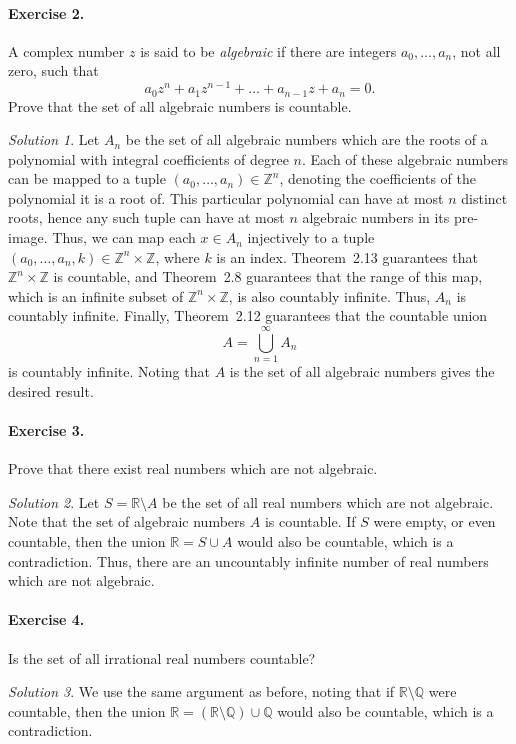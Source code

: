 \documentclass[11pt]{report}
\def\R{\mathbb{R}}
\def\Q{\mathbb{Q}}
\def\Z{\mathbb{Z}}
\theoremstyle{remark}
\newtheorem*{solution}{Solution}
\begin{document}
    \paragraph{Exercise 2.} A complex number $z$ is said to be
    \textit{algebraic} if there are integers $a_0, \dots, a_n$, not all zero,
    such that \[
        a_0z^n + a_1z^{n - 1} + \dots + a_{n - 1}z + a_n = 0.
    \] Prove that the set of all algebraic numbers is countable.
    \begin{solution}
        Let $A_n$ be the set of all algebraic numbers which are the roots of a
        polynomial with integral coefficients of degree $n$. Each of these
        algebraic numbers can be mapped to a tuple $(a_0, \dots, a_n) \in
        \Z^n$, denoting the coefficients of the polynomial it is a root of. This
        particular polynomial can have at most $n$ distinct roots, hence any such
        tuple can have at most $n$ algebraic numbers in its pre-image. Thus, we can
        map each $x \in A_n$ injectively to a tuple $(a_0, \dots, a_n, k) \in \Z^n
        \times \Z$, where $k$ is an index. Theorem~2.13 guarantees that
        $\Z^n\times\Z$ is countable, and Theorem~2.8 guarantees that the range of
        this map, which is an infinite subset of $\Z^n\times\Z$, is also countably
        infinite. Thus, $A_n$ is countably infinite.  Finally, Theorem~2.12
        guarantees that the countable union \[
            A = \bigcup_{n = 1}^\infty A_n
        \] is countably infinite. Noting that $A$ is the set of all algebraic
        numbers gives the desired result.
    \end{solution}

    \paragraph{Exercise 3.} Prove that there exist real numbers which are not
    algebraic.
    \begin{solution}
        Let $S = \R\setminus A$ be the set of all real numbers which are not
        algebraic. Note that the set of algebraic numbers $A$ is countable. If $S$ were 
        empty, or even countable, then the union $\R = S \cup A$ would also be
        countable, which is a contradiction. Thus, there are an uncountably infinite
        number of real numbers which are not algebraic.
    \end{solution}
    
    \paragraph{Exercise 4.} Is the set of all irrational real numbers countable?
    \begin{solution}
        We use the same argument as before, noting that if $\R\setminus\Q$ were
        countable, then the union $\R = (\R\setminus\Q) \cup \Q$ would also be
        countable, which is a contradiction.
    \end{solution}
\end{document}

